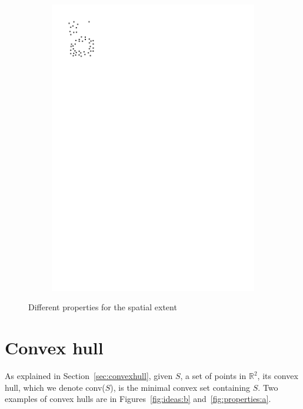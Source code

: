 \begin{figure}
\begin{subfigure}[b]{0.15\linewidth}
    \includegraphics[page=3,width=\textwidth]{figs/properties.pdf}
    \caption{}
    \label{fig:properties:d}
  \end{subfigure}
\caption{Different properties for the spatial extent}
\label{fig:properties}  
\end{figure}


%
\section{Convex hull}

As explained in Section~\ref{sec:convexhull}, given $S$, a set of points in $\mathbb{R}^2$, its convex hull, which we denote conv($S$), is the minimal convex set containing $S$.
Two examples of convex hulls are in Figures~\ref{fig:ideas:b} and~\ref{fig:properties:a}.

%

